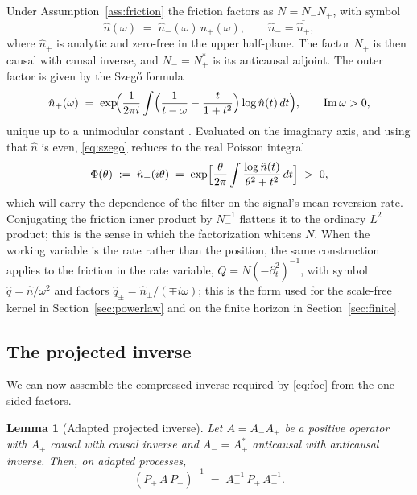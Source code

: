 \documentclass[11pt]{article}
\theoremstyle{plain}
\newtheorem{lemma}{Lemma}
\theoremstyle{definition}
\theoremstyle{remark}
\begin{document}
Under Assumption~\ref{ass:friction} the friction factors as $N=N_-N_+$, with symbol
\begin{equation}\label{eq:wh}
\hat n(\omega) \;=\; \hat n_-(\omega)\,\hat n_+(\omega), \qquad \hat n_-=\overline{\hat n_+},
\end{equation}
where $\hat n_+$ is analytic and zero-free in the upper half-plane. The factor $N_+$ is then causal with causal inverse, and $N_-=N_+^\ast$ is its anticausal adjoint. The outer factor is given by the Szeg\H{o} formula
\begin{equation}\label{eq:szego}
\hat n_+(\omega) \;=\; \exp\!\Bigl(\frac{1}{2\pi i}\int\Bigl(\frac{1}{t-\omega}-\frac{t}{1+t^2}\Bigr)\log\hat n(t)\,dt\Bigr),
\qquad \operatorname{Im}\omega>0,
\end{equation}
unique up to a unimodular constant \citep{Krein1962}. Evaluated on the imaginary axis, and using that $\hat n$ is even, \eqref{eq:szego} reduces to the real Poisson integral
\begin{equation}\label{eq:phi}
\Phi(\theta) \;:=\; \hat n_+(i\theta) \;=\; \exp\Bigl[\frac{\theta}{2\pi}\int\frac{\log\hat n(t)}{\theta^2+t^2}\,dt\Bigr] \;>\;0,
\end{equation}
which will carry the dependence of the filter on the signal's mean-reversion rate. Conjugating the friction inner product by $N_-^{-1}$ flattens it to the ordinary $L^2$ product; this is the sense in which the factorization whitens $N$. When the working variable is the rate rather than the position, the same construction applies to the friction in the rate variable, $Q=N(-\partial_t^2)^{-1}$, with symbol $\hat q=\hat n/\omega^2$ and factors $\hat q_\pm=\hat n_\pm/(\mp i\omega)$; this is the form used for the scale-free kernel in Section~\ref{sec:powerlaw} and on the finite horizon in Section~\ref{sec:finite}.

\subsection{The projected inverse}\label{sec:pi}

We can now assemble the compressed inverse required by \eqref{eq:foc} from the one-sided factors.

\begin{lemma}[Adapted projected inverse]\label{lem:pi}
Let $A=A_-A_+$ be a positive operator with $A_+$ causal with causal inverse and $A_-=A_+^\ast$ anticausal with anticausal inverse. Then, on adapted processes,
\begin{equation}\label{eq:pi}
(P_+\,A\,P_+)^{-1} \;=\; A_+^{-1}\,P_+\,A_-^{-1}.
\end{equation}
\end{lemma}
\end{document}
